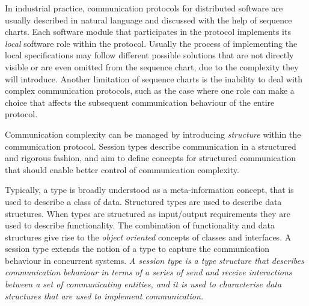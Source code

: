 In industrial practice, communication protocols for
distributed software are usually described in natural language and
discussed with the help of sequence charts.
Each software module that participates in the
protocol implements
its \emph{local} software role within the protocol.
Usually the process of implementing the local specifications
may follow different possible solutions that are not directly
visible or are even omitted from the sequence chart, due
to the complexity they will introduce. 
Another limitation of sequence charts is the inability to deal with complex
communication protocols, such as the case where one role
can make a choice that affects the subsequent communication behaviour
of the entire protocol.

Communication complexity can be managed by 
introducing \emph{structure} within the communication protocol.
Session types describe communication in a structured and rigorous fashion,
and aim to define concepts for structured communication
that should enable better control of communication complexity.


Typically, a type is broadly understood
as a meta-information concept, that is used to describe a class of data.
Structured types are used to describe data structures.
When types are structured as input/output requirements they
are used to describe functionality.
The combination of functionality and data structures give rise
to the \emph{object oriented} concepts of classes and interfaces.%
%
A session type extends %
the notion of a type to capture the communication behaviour in concurrent systems.
{\em A session type is a type structure that describes communication
	behaviour in terms of a series of send and receive %
	interactions between a set of communicating entities, and it is used
	to characterise data structures that are used to implement communication.} 

